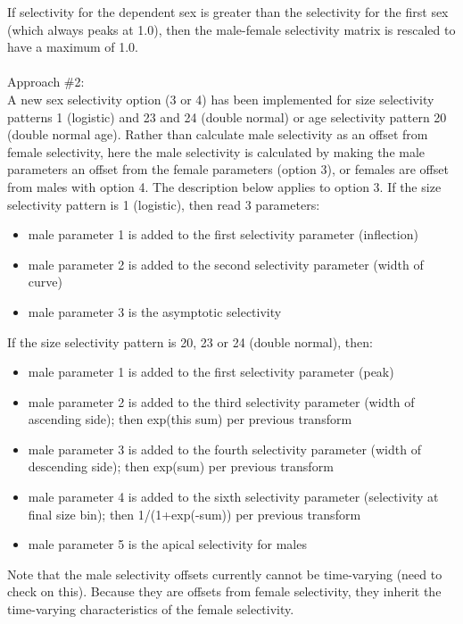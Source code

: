 If selectivity for the dependent sex is greater than the selectivity for the first sex (which always peaks at 1.0), then the male-female selectivity matrix is rescaled to have a maximum of 1.0.\\
\\
Approach \#2:\\
A new sex selectivity option (3 or 4) has been implemented for size selectivity patterns 1 (logistic) and 23 and 24 (double normal) or age selectivity pattern 20 (double normal age).  Rather than calculate male selectivity as an offset from female selectivity, here the male selectivity is calculated by making the male parameters an offset from the female parameters (option 3), or females are offset from males with option 4.  The description below applies to option 3. If the size selectivity pattern is 1 (logistic), then read 3 parameters:
\begin{itemize}
	\item male parameter 1 is added to the first selectivity parameter (inflection)
	\item male parameter 2 is added to the second selectivity parameter (width of curve)
	\item male parameter 3 is the asymptotic selectivity
\end{itemize}

If the size selectivity pattern is 20, 23 or 24 (double normal), then:
\begin{itemize}
	\item male parameter 1 is added to the first selectivity parameter (peak)
	\item male parameter 2 is added to the third selectivity parameter (width of ascending side); then exp(this sum) per previous transform
	\item male parameter 3 is added to the fourth selectivity parameter (width of descending side); then exp(sum) per previous transform
	\item male parameter 4 is added to the sixth selectivity parameter (selectivity at final size bin); then 1/(1+exp(-sum)) per previous transform
	\item male parameter 5 is the apical selectivity for males
\end{itemize}

Note that the male selectivity offsets currently cannot be time-varying (need to check on this).  Because they are offsets from female selectivity, they inherit the time-varying characteristics of the female selectivity.

